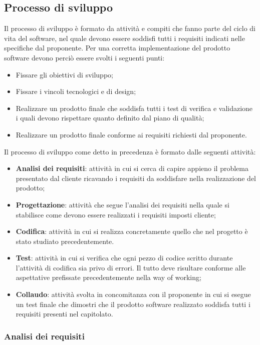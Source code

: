 \subsection{Processo di sviluppo}
Il processo di sviluppo è formato da attività e compiti che fanno parte del ciclo di vita del software, nel quale devono essere soddisfi tutti i requisiti indicati nelle specifiche dal proponente. Per una corretta implementazione del prodotto software devono perciò essere svolti i seguenti punti: 
\begin{itemize}
	\item Fissare gli obiettivi di sviluppo;
	\item Fissare i vincoli tecnologici e di design;
	\item Realizzare un prodotto finale che soddisfa tutti i test di verifica e validazione i quali devono rispettare quanto definito dal piano di qualità;
	\item Realizzare un prodotto finale conforme ai requisiti richiesti dal proponente.
\end{itemize}		
Il processo di sviluppo come detto in precedenza è formato dalle seguenti attività:
\begin{itemize}
	\item \textbf{Analisi dei requisiti}: attività in cui si cerca di capire appieno il problema presentato dal cliente ricavando i requisiti da soddisfare nella realizzazione del prodotto;
	\item \textbf{Progettazione}: attività che segue l'analisi dei requisiti nella quale si stabilisce come devono essere realizzati i requisiti imposti cliente;
	\item \textbf{Codifica}: attività in cui si realizza concretamente quello che nel progetto è stato  studiato precedentemente.
	\item \textbf{Test}: attività in cui si verifica che ogni pezzo di codice scritto durante l'attività di codifica sia privo di errori. Il tutto deve risultare conforme alle aspettative prefissate precedentemente nella way of working;
\item \textbf{Collaudo}: attività svolta in concomitanza con il proponente in cui si esegue un test finale che dimostri che il prodotto software realizzato soddisfa tutti i requisiti presenti nel capitolato.
\end{itemize}
\subsubsection{Analisi dei requisiti}
